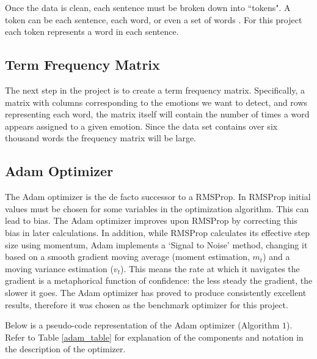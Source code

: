 \documentclass[titlepage,letterpaper]{article}
\begin{document}
Once the data is clean, each sentence must be broken down into ``tokens". A token can be each sentence, each word, or even a set of words \cite{TextMining}. For this project each token represents a word in each sentence. 

\subsection{Term Frequency Matrix}
The next step in the project is to create a term frequency matrix. Specifically, a matrix with columns corresponding to the emotions we want to detect, and rows representing each word, the matrix itself will contain the number of times a word appears assigned to a given emotion. Since the data set contains over six thousand words the frequency matrix will be large.

\subsection{Adam Optimizer}
The Adam optimizer is the de facto successor to a RMSProp. In RMSProp initial values must be chosen for some variables in the optimization algorithm. This can lead to bias. The Adam optimizer improves upon RMSProp by correcting this bias in later calculations. In addition, while RMSProp calculates its effective step size using momentum, Adam implements a `Signal to Noise' method, changing it based on a smooth gradient moving average (moment estimation, $m_t$) and a moving variance estimation ($v_t$). This means the rate at which it navigates the gradient is a metaphorical function of confidence: the less steady the gradient, the slower it goes. The Adam optimizer has proved to produce consistently excellent results, therefore it was chosen as the benchmark optimizer for this project.

Below is a pseudo-code representation of the Adam optimizer (Algorithm $1$). Refer to Table \ref{adam_table} for explanation of the components and notation in the description of the optimizer.
\end{document}
